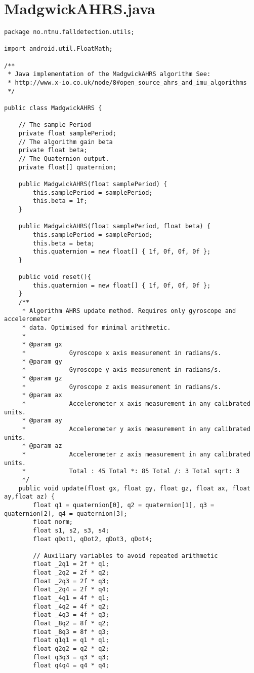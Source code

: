 \chapter{MadgwickAHRS.java}
\begin{lstlisting}
package no.ntnu.falldetection.utils;

import android.util.FloatMath;

/**
 * Java implementation of the MadgwickAHRS algorithm See:
 * http://www.x-io.co.uk/node/8#open_source_ahrs_and_imu_algorithms
 */

public class MadgwickAHRS {

	// The sample Period
	private float samplePeriod;
	// The algorithm gain beta
	private float beta;
	// The Quaternion output.
	private float[] quaternion;

	public MadgwickAHRS(float samplePeriod) {
		this.samplePeriod = samplePeriod;
		this.beta = 1f;
	}

	public MadgwickAHRS(float samplePeriod, float beta) {
		this.samplePeriod = samplePeriod;
		this.beta = beta;
		this.quaternion = new float[] { 1f, 0f, 0f, 0f };
	}

	public void reset(){
		this.quaternion = new float[] { 1f, 0f, 0f, 0f };
	}
	/**
	 * Algorithm AHRS update method. Requires only gyroscope and accelerometer
	 * data. Optimised for minimal arithmetic.
	 * 
	 * @param gx
	 *            Gyroscope x axis measurement in radians/s.
	 * @param gy
	 *            Gyroscope y axis measurement in radians/s.
	 * @param gz
	 *            Gyroscope z axis measurement in radians/s.
	 * @param ax
	 *            Accelerometer x axis measurement in any calibrated units.
	 * @param ay
	 *            Accelerometer y axis measurement in any calibrated units.
	 * @param az
	 *            Accelerometer z axis measurement in any calibrated units.
	 *            Total : 45 Total *: 85 Total /: 3 Total sqrt: 3
	 */
	public void update(float gx, float gy, float gz, float ax, float ay,float az) {
		float q1 = quaternion[0], q2 = quaternion[1], q3 = quaternion[2], q4 = quaternion[3]; 
		float norm;
		float s1, s2, s3, s4;
		float qDot1, qDot2, qDot3, qDot4;

		// Auxiliary variables to avoid repeated arithmetic
		float _2q1 = 2f * q1;
		float _2q2 = 2f * q2;
		float _2q3 = 2f * q3;
		float _2q4 = 2f * q4;
		float _4q1 = 4f * q1;
		float _4q2 = 4f * q2;
		float _4q3 = 4f * q3;
		float _8q2 = 8f * q2;
		float _8q3 = 8f * q3;
		float q1q1 = q1 * q1;
		float q2q2 = q2 * q2;
		float q3q3 = q3 * q3;
		float q4q4 = q4 * q4;


\end{lstlisting}
